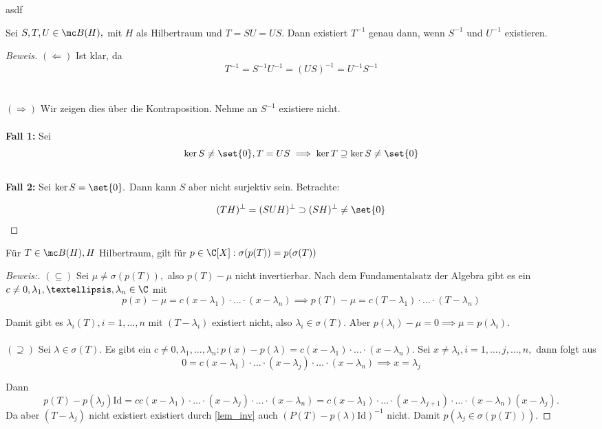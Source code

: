 asdf
\begin{lemma} Sei $S, T, U \in \mc B(H),$ mit $H$ als Hilbertraum und $T = SU = US.$ Dann existiert $T^{-1}$ genau dann, wenn $S^{-1}$ und $U^{-1}$ existieren. 
	
	
	\begin{proof}[Beweis] $(\Leftarrow)$ Ist klar, da \[T^{-1} = S^{-1}U^{-1} = (US)^{-1} = U^{-1}S^{-1}\] \\ \\
		
		$(\Rightarrow)$ Wir zeigen dies über die Kontraposition. Nehme an $S^{-1}$ existiere nicht. \\ \\
		
		\textbf{Fall 1:} Sei \[\ker{S} \not= \set{0}, T = US \implies \ker{T} \supseteq \ker{S} \not= \set{0}\] \\
		
		\textbf{Fall 2:} Sei $\ker{S} = \set{0}.$ Dann kann $S$ aber nicht surjektiv sein. Betrachte:
		
		\[(TH)^{\perp} = (SUH)^{\perp} \supset (SH)^{\perp} \not= \set{0}\] 
		
		
	\end{proof}
	
\end{lemma}


\begin{theorem} \label{lem_inv} Für $T \in \mc B(H), H$ Hilbertraum, gilt für $p \in \C[X]: \sigma(p(T))= p(\sigma(T))$
	
	
	\begin{proof}[Beweis:] $(\subseteq)$ Sei $\mu \not= \sigma(p(T)),$ also $p(T)-\mu$ nicht invertierbar. Nach dem Fundamentalsatz der Algebra gibt es ein $c \not= 0, \lambda_1, …, \lambda_n \in \C$ mit \[p(x)- \mu = c(x- \lambda_1)\cdot \dots \cdot (x- \lambda_n) \implies p(T)-\mu = c(T-\lambda_1) \cdot … \cdot (T- \lambda_n)\]
		
		Damit gibt es $\lambda_i (T), i = 1, …, n$ mit $(T- \lambda_i)$ existiert nicht, also $\lambda_i \in \sigma(T).$ Aber $p(\lambda_i)- \mu = 0 \implies \mu = p(\lambda_i).$ \\ \\
		
		$(\supseteq)$ Sei $\lambda \in \sigma(T).$ Es gibt ein $c \not= 0, \lambda_1, …, \lambda_n: p(x)-p(\lambda) = c(x-\lambda_1)\cdot \dots \cdot (x- \lambda_n).$ Sei $x \not= \lambda_i, i = 1, \dots,j, \dots, n,$ dann folgt aus \[0 = c(x- \lambda_1)\cdot \dots \cdot (x- \lambda_j) \cdot \dots \cdot (x- \lambda_n) \implies x= \lambda_j\]
		
		Dann \[p(T)-p(\lambda_j)\text{Id} = cc(x- \lambda_1)\cdot \dots \cdot (x- \lambda_j) \cdot \dots \cdot (x- \lambda_n) = c(x- \lambda_1)\cdot \dots \cdot (x- \lambda_{j+1}) \cdot \dots \cdot (x- \lambda_n) (x- \lambda_j).\] Da aber $(T-\lambda_j)$ nicht existiert existiert durch \ref{lem_inv} auch $(P(T)-p(\lambda)\text{Id})^{-1}$ nicht. Damit $p(\lambda_j \in \sigma(p(T))).$
		
	\end{proof}
	
\end{theorem}


